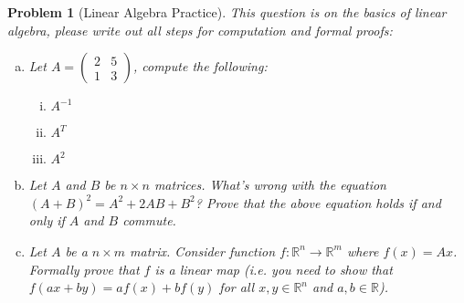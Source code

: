 \documentclass[10pt]{article}
\newtheorem{problem}{\sc\color{cit}Problem}
\begin{document}
\newpage
\begin{problem}[Linear Algebra Practice]
This question is on the basics of linear algebra, please write out all steps for computation and formal proofs:
\begin{enumerate}[(a)]
    \item Let $A = \begin{pmatrix} 2 & 5 \\ 1 & 3 \end{pmatrix}$, compute the following:
    \begin{enumerate}[(i)]
        \item $A^{-1}$
        \item $A^T$
        \item $A^2$
    \end{enumerate}
    \item Let $A$ and $B$ be $n\times n$ matrices. What's wrong with the equation $(A+B)^2 = A^2 + 2AB + B^2$? Prove that the above equation holds if and only if $A$ and $B$ commute.
    \item Let $A$ be a $n \times m$ matrix. Consider function $f: \mathbb{R}^n \rightarrow \mathbb{R}^m$ where $f(x) = Ax$. Formally prove that $f$ is a linear map (i.e. you need to show that $f(ax+by) = af(x) + bf(y)$ for all $x, y \in \mathbb{R}^n$ and $a, b \in \mathbb{R}$).
\end{enumerate}
    
\end{problem}
\end{document}
